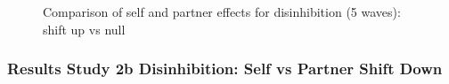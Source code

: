 \documentclass[
  singlecolumn]{article}
\begin{document}
\begin{figure}


\caption{\label{fig-results-disinhibition-self-partner-up-long-comparison}Comparison
of self and partner effects for disinhibition (5 waves): shift up vs
null}

\end{figure}%

\newpage{}

\subsubsection{Results Study 2b Disinhibition: Self vs Partner Shift
Down}\label{results-study-2b-disinhibition-self-vs-partner-shift-down}
\end{document}
